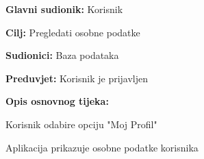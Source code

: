 					\noindent {}
					\begin{packed_item}
	
						\item \textbf{Glavni sudionik: } Korisnik
						\item  \textbf{Cilj:} Pregledati osobne podatke
						\item  \textbf{Sudionici:} Baza podataka
						\item  \textbf{Preduvjet:} Korisnik je prijavljen
						\item  \textbf{Opis osnovnog tijeka:}
						
						\item[] \begin{packed_enum}
	
							\item Korisnik odabire opciju "Moj Profil"
							\item Aplikacija prikazuje osobne podatke korisnika
						\end{packed_enum}
						
						
					\end{packed_item}

